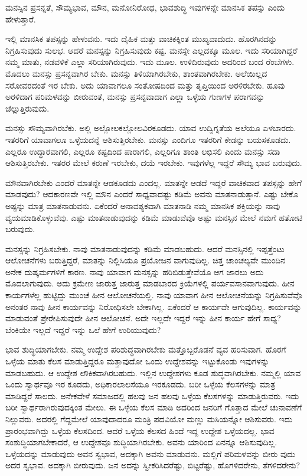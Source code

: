 {\small ಮನಸ್ಸಿನ ಪ್ರಸನ್ನತೆ, ಸೌಮ್ಯಭಾವ, ಮೌನ, ಮನೋನಿರೋಧ, ಭಾವಶುದ್ಧಿ ಇವುಗಳನ್ನೇ ಮಾನಸಿಕ ತಪಸ್ಸು ಎಂದು ಹೇಳುತ್ತಾರೆ.}

ಇಲ್ಲಿ ಮಾನಸಿಕ ತಪಸ್ಸನ್ನು ಹೇಳುವನು. ಇದು ದೈಹಿಕ ಮತ್ತು ವಾಚಿಕಕ್ಕಿಂತ ಮುಖ್ಯವಾದುದು. ಹೊರಗಿನದನ್ನು ನಿಗ್ರಹಿಸುವುದು ಸುಲಭ. ಆದರೆ ಮನಸ್ಸನ್ನು ನಿಗ್ರಹಿಸುವುದು ಕಷ್ಟ. ಮನಸ್ಸೇ ಎಲ್ಲದಕ್ಕೂ ಮೂಲ. ಇದು ಸರಿಯಾಗಿದ್ದರೆ ನಮ್ಮ ಮಾತು, ನಡವಳಿಕೆ ಎಲ್ಲಾ ಸರಿಯಾಗಿರುವುದು. ಇದು ಮೂಲ. ಉಳಿದಿರುವುದು ಅದರಿಂದ ಬಂದ ರೆಂಬೆಗಳು. ಮೊದಲು ಮನಸ್ಸು ಪ್ರಸನ್ನವಾಗಿರ ಬೇಕು. ಮನಸ್ಸು ತಿಳಿಯಾಗಿರಬೇಕು, ಶಾಂತವಾಗಿರಬೇಕು. ಅಲೆಯಿಲ್ಲದ ಸರೋವರದಂತೆ ಇರ ಬೇಕು. ಅದು ಯಾವಾಗಲೂ ಸಂತೋಷದಿಂದ ಮತ್ತು ತೃಪ್ತಿಯಿಂದ ಅರಳಿರಬೇಕು. ಹೂವು ಅರಳಿದಾಗ ಪರಿಮಳವನ್ನು ಬೀರುವಂತೆ, ಮನಸ್ಸು ಪ್ರಸನ್ನವಾದಾಗ ಎಲ್ಲಾ ಒಳ್ಳೆಯ ಗುಣಗಳ ಪರಾಗವನ್ನು ಚೆಲ್ಲುತ್ತಿರುವುದು.

ಮನಸ್ಸು ಸೌಮ್ಯವಾಗಿರಬೆಕು. ಅಲ್ಲಿ ಅಲ್ಲೋಲಕಲ್ಲೋಲವಿರಕೂಡದು. ಯಾವ ಉದ್ವಿಗ್ನತೆಯ ಅಲೆಯೂ ಏಳಬಾರದು. ಇತರರಿಗೆ ಯಾವಾಗಲೂ ಒಳ್ಳೆಯದನ್ನೆ ಆಶಿಸುತ್ತಿರಬೇಕು. ಮನಸ್ಸು ಎಂದಿಗೂ ಇತರರಿಗೆ ಕೇಡನ್ನು ಬಯಸಕೂಡದು. ಎಲ್ಲರೂ ಉದ್ಧಾರವಾಗಲಿ, ಎಲ್ಲರೂ ಕಷ್ಟದಿಂದ ಪಾರಾಗಲಿ, ಎಲ್ಲರಿಗೂ ಶಾಂತಿ ಲಭಿಸಲಿ ಎಂದು ಮನಸ್ಸು ಸದಾ ಆಶಿಸುತ್ತಿರಬೇಕು. ಇತರರ ಮೇಲೆ ಕರುಣೆ ಇರಬೇಕು, ದಯೆ ಇರಬೇಕು. ಇವುಗಳೆಲ್ಲ ಇದ್ದರೆ ಸೌಮ್ಯ ಭಾವ ಬರುವುದು.

ಮೌನವಾಗಿರಬೇಕು ಎಂದರೆ ಮಾತನ್ನೇ ಆಡಕೂಡದು ಎಂದಲ್ಲ. ಮಾತನ್ನೇ ಆಡದೆ ಇದ್ದರೆ ವಾಚಿಕವಾದ ತಪಸ್ಸನ್ನು ಹೇಗೆ ಮಾಡವುದು? ಆದಕಾರಣವೇ ಇಲ್ಲಿ ಮೌನ ಎಂದರೆ ಸಾಧ್ಯವಾದಷ್ಟು ಕಡಿಮೆ ಅವನು ಮಾತನಾಡುತ್ತಾನೆ. ಎಷ್ಟು ಬೇಕೊ ಅಷ್ಟನ್ನು ಮಾತ್ರ ಮಾತನಾಡುವನು. ಏಕೆಂದರೆ ಅನಾವಶ್ಯಕವಾಗಿ ಮಾತನಾಡಿ ನಮ್ಮ ಮಾನಸಿಕ ಶಕ್ತಿಯನ್ನು ನಾವು ವ್ಯಯಮಾಡಿಕೊಳ್ಳುವೆವು. ಎಷ್ಟು ಮಾತನಾಡುವುದನ್ನು ಕಡಿಮೆ ಮಾಡುವೆವೊ ಅಷ್ಟು ಮನಸ್ಸಿನ ಮೇಲೆ ನಮಗೆ ಹತೋಟಿ ಬರುವುದು.

ಮನಸ್ಸನ್ನು ನಿಗ್ರಹಿಸಬೇಕು. ನಾವು ಮಾತನಾಡುವುದನ್ನು ಕಡಿಮೆ ಮಾಡಬಹುದು. ಆದರೆ ಮನಸ್ಸಿನಲ್ಲಿ ಇಪ್ಪತ್ತೆಂಟು ಆಲೋಚನೆಗಳು ಬರುತ್ತಿದ್ದರೆ, ಮಾತನ್ನು ನಿಲ್ಲಿಸಿಯೂ ಪ್ರಯೋಜನ ವಾಗುವುದಿಲ್ಲ. ಚಿತ್ತ ಚಾಂಚಲ್ಯವೇ ಮುಂದಿನ ಅನೇಕ ದುಷ್ಕರ್ಮಗಳಿಗೆ ಕಾರಣ. ನಾವು ಯಾವಾಗ ಮನಸ್ಸನ್ನು ಹರಿಬಿಡುತ್ತೇವೆಯೊ ಆಗ ಜಾರಲು ಅದು ಮೊದಲಾಗುವುದು. ಅದು ಕ್ರಮೇಣ ಜಾರುತ್ತ ಜಾರುತ್ತ ಮಾಡಬಾರದ ಕ್ರಿಯೆಗಳಲ್ಲಿ ಪರ್ಯವಸಾನವಾಗುವುದು. ಹೀನ ಕಾರ್ಯಗಳೆಲ್ಲ ಹುಟ್ಟಿದ್ದು ಮುಂಚೆ ಹೀನ ಆಲೋಚನೆಯಲ್ಲಿ. ನಾವು ಯಾವಾಗ ಹೀನ ಆಲೋಚನೆಯನ್ನು ನಿಗ್ರಹಿಸುವೆವೊ ಅನಂತರ ನಾವು ಹೀನ ಕಾರ್ಯವನ್ನು ನಿರೋಧಿಸಲೇ ಬೇಕಾಗಿಲ್ಲ. ಏಕೆಂದರೆ ಆ ಕಾರ್ಯವೇ ಆಗುವುದಿಲ್ಲ. ಕಾರ್ಯವನ್ನು ಮಾಡುವಂತೆ ಪ್ರೇರೇಪಿಸುವುದೇ ಹೀನ ಆಲೋಚನೆ. ಅದೇ ಇಲ್ಲದೇ ಇದ್ದರೆ ಇನ್ನು ಹೀನ ಕಾರ್ಯ ಹೇಗೆ ಸಾಧ್ಯ? ಬೆಂಕಿಯೇ ಇಲ್ಲದೆ ಇದ್ದರೆ ಇನ್ನು ಒಲೆ ಹೇಗೆ ಉರಿಯುವುದು?

ಭಾವ ಶುದ್ಧಿಯಾಗಬೇಕು. ನಮ್ಮ ಉದ್ದೇಶ ಪರಿಶುದ್ಧವಾಗಿರಬೇಕು ಮತ್ತೊಬ್ಬರೊಡನೆ ವ್ಯವ ಹರಿಸುವಾಗ. ಹೊರಗೆ ಒಳ್ಳೆಯ ಮಾತು ಕೆಲಸ ಮಾಡುತ್ತಿದ್ದರೂ ಮತ್ತಾವುದೋ ಒಂದು ಉದ್ದೇಶವನ್ನು ಇಟ್ಟುಕೊಂಡು ಇವುಗಳನ್ನು ಮಾಡಬಹುದು. ಆ ಉದ್ದೇಶ ಲೌಕಿಕವಾಗಿರಬಹುದು. ಇಲ್ಲಿನ ಉದ್ದೇಶಗಳು ಕೂಡ ಶುದ್ಧವಾಗಿರಬೇಕು. ನಮ್ಮಲ್ಲಿ ಯಾವ ಒಂದು ಸ್ವಾರ್ಥವೂ ಇರ ಕೂಡದು, ಅಧಿಕಾರಲಾಲಸೆಯೂ ಇರಕೂಡದು. ಬರೀ ಒಳ್ಳೆಯ ಕೆಲಸಗಳನ್ನು ಮಾತ್ರ ಮಾಡಿದ್ದರೆ ಸಾಲದು. ಅನೇಕವೇಳೆ ಸಮಾಜದಲ್ಲಿ ಹಲವು ಜನ ಹಲವು ಒಳ್ಳೆಯ ಕೆಲಸಗಳನ್ನು ಮಾಡುತ್ತಿರುವರು. ಇದು ಬರೀ ಸ್ವಾರ್ಥರಾಗಿರುವುದಕ್ಕಿಂತ ಮೇಲು. ಈ ಒಳ್ಳೆಯ ಕೆಲಸ ಮಾಡಿ ಅದರಿಂದ ಜನರಿಗೆ ಗೊತ್ತಾದ ಮೇಲೆ ಚುನಾವಣೆಗೆ ನಿಲ್ಲುವರು. ಅದರಲ್ಲಿ ಗೆದ್ದಮೇಲೆ ಯಾವುದಾದರೂ ಮಂತ್ರಿ ಪದವಿಯೋ ಮಣ್ಣು ಮಸಿಯನ್ನೋ ಆಶಿಸುವರು. ಇದು ಪ್ರಾರಂಭವಾಗಿದ್ದು ಒಳ್ಳೆಯ ಕೆಲಸದಿಂದ. ಆದರೆ ಒಳ್ಳೆಯ ಕೆಲಸದ ಹಿಂದೆ ಇದ್ದ ಉದ್ದೇಶ ಒಳ್ಳೆಯದಲ್ಲ. ಭಾವ ಸಂಶುದ್ಧಿಯಾಗಬೇಕಾದರೆ, ಆ ಉದ್ದೇಶವೂ ಶುದ್ಧಿಯಾಗಿರಬೇಕು. ಅವನು ಯಾರಿಂದ ಏನನ್ನೂ ಆಶಿಸುವುದಿಲ್ಲ. ಒಳ್ಳೆಯದನ್ನು ಮಾಡುವುದು ಅವನ ಸ್ವಭಾವ, ಅದಕ್ಕಾಗಿ ಅವನು ಮಾಡುವನು. ಮಲ್ಲಿಗೆ ಪರಿಮಳವನ್ನು ಬೀರು ವುದು ಅದರ ಸ್ವಭಾವ. ಅದಕ್ಕಾಗಿ ಬೀರುವುದು. ಜನ ಅದನ್ನು ಸ್ವೀಕರಿಸಿದರೆಷ್ಟು, ಬಿಟ್ಟರೆಷ್ಟು, ಹೊಗಳಿದರೇನು, ತೆಗಳಿದರೇನು?

